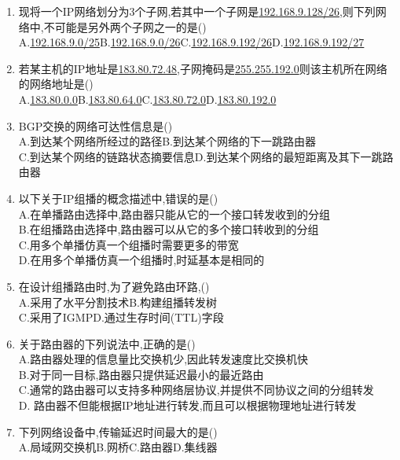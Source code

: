 \documentclass[12pt, a4paper, oneside, UTF8]{ctexbook}
\begin{document}
\begin{enumerate}
    \item 现将一个IP网络划分为3个子网,若其中一个子网是\underline{192.168.9.128/26},则下列网络中,不可能是另外两个子网之一的是() \\
    A.\underline{192.168.9.0/25}\quad B.\underline{192.168.9.0/26}\quad C.\underline{192.168.9.192/26}\quad D.\underline{192.168.9.192/27}

    \item 若某主机的IP地址是\underline{183.80.72.48},子网掩码是\underline{255.255.192.0}则该主机所在网络的网络地址是() \\
    A.\underline{183.80.0.0}\qquad B.\underline{183.80.64.0}\qquad C.\underline{183.80.72.0}\qquad D.\underline{183.80.192.0}

    \item BGP交换的网络可达性信息是() \\
    A.到达某个网络所经过的路径\qquad B.到达某个网络的下一跳路由器 \\
    C.到达某个网络的链路状态摘要信息\quad D.到达某个网络的最短距离及其下一跳路由器

    \item 以下关于IP组播的概念描述中,错误的是() \\
    A.在单播路由选择中,路由器只能从它的一个接口转发收到的分组 \\
    B.在组播路由选择中,路由器可以从它的多个接口转收到的分组 \\
    C.用多个单播仿真一个组播时需要更多的带宽 \\
    D.在用多个单播仿真一个组播时,时延基本是相同的

    \item 在设计组播路由时,为了避免路由环路,() \\
    A.采用了水平分割技术\qquad B.构建组播转发树\\ 
    C.采用了IGMP\qquad D.通过生存时间(TTL)字段 

    \item 关于路由器的下列说法中,正确的是() \\
    A.路由器处理的信息量比交换机少,因此转发速度比交换机快 \\
    B.对于同一目标,路由器只提供延迟最小的最近路由 \\
    C.通常的路由器可以支持多种网络层协议,并提供不同协议之间的分组转发 \\
    D. 路由器不但能根据IP地址进行转发,而且可以根据物理地址进行转发

    \item 下列网络设备中,传输延迟时间最大的是() \\
    A.局域网交换机\qquad B.网桥\qquad C.路由器\qquad D.集线器 


\end{enumerate}
\end{document}
